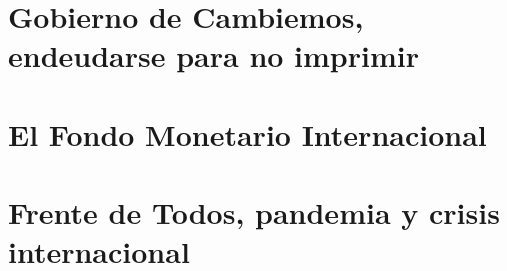 \documentclass[12pt]{article}
\begin{document}
\tableofcontents


\section{Gobierno de Cambiemos, endeudarse para no imprimir}
\section{El Fondo Monetario Internacional}
\section{Frente de Todos, pandemia y crisis internacional}



\end{document}
